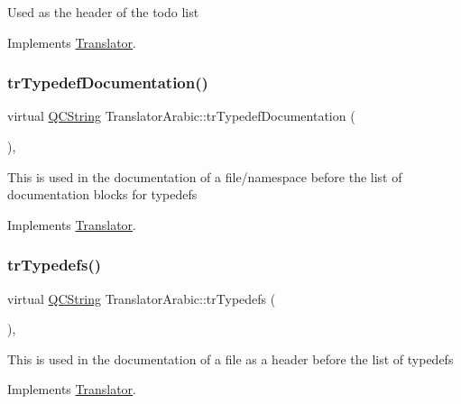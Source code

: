 Used as the header of the todo list 

Implements \mbox{\hyperlink{class_translator}{Translator}}.

\mbox{\label{class_translator_arabic_a8dcda8ec8d47583d94567a48154cdcf0}} 
\subsubsection{\texorpdfstring{trTypedefDocumentation()}{trTypedefDocumentation()}}
{\footnotesize\ttfamily virtual \mbox{\hyperlink{class_q_c_string}{Q\+C\+String}} Translator\+Arabic\+::tr\+Typedef\+Documentation (\begin{DoxyParamCaption}{ }\end{DoxyParamCaption})\hspace{0.3cm}{\ttfamily [inline]}, {\ttfamily [virtual]}}

This is used in the documentation of a file/namespace before the list of documentation blocks for typedefs 

Implements \mbox{\hyperlink{class_translator}{Translator}}.

\mbox{\label{class_translator_arabic_a30fbc478e83497bb46e33374a3407b64}} 
\subsubsection{\texorpdfstring{trTypedefs()}{trTypedefs()}}
{\footnotesize\ttfamily virtual \mbox{\hyperlink{class_q_c_string}{Q\+C\+String}} Translator\+Arabic\+::tr\+Typedefs (\begin{DoxyParamCaption}{ }\end{DoxyParamCaption})\hspace{0.3cm}{\ttfamily [inline]}, {\ttfamily [virtual]}}

This is used in the documentation of a file as a header before the list of typedefs 

Implements \mbox{\hyperlink{class_translator}{Translator}}.

\mbox{\label{class_translator_arabic_a2c30e187e8c3b7c9fb36b8e81052907f}} 
